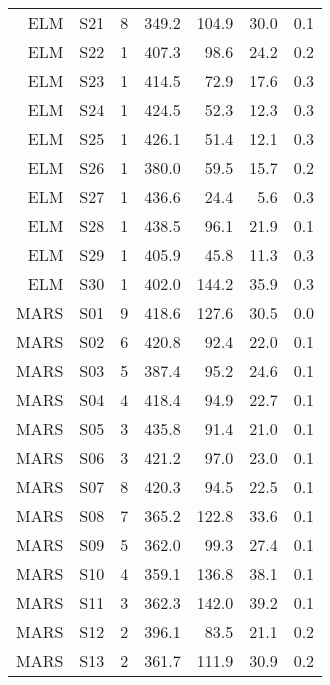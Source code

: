 \begin{table}
\begin{tabular}{rrrrrrr}
  ELM &  S21 &             8 &   349.2 & 104.9 &         30.0 &    0.1 \\
  ELM &  S22 &             1 &   407.3 &  98.6 &         24.2 &    0.2 \\
  ELM &  S23 &             1 &   414.5 &  72.9 &         17.6 &    0.3 \\
  ELM &  S24 &             1 &   424.5 &  52.3 &         12.3 &    0.3 \\
  ELM &  S25 &             1 &   426.1 &  51.4 &         12.1 &    0.3 \\
  ELM &  S26 &             1 &   380.0 &  59.5 &         15.7 &    0.2 \\
  ELM &  S27 &             1 &   436.6 &  24.4 &          5.6 &    0.3 \\
  ELM &  S28 &             1 &   438.5 &  96.1 &         21.9 &    0.1 \\
  ELM &  S29 &             1 &   405.9 &  45.8 &         11.3 &    0.3 \\
  ELM &  S30 &             1 &   402.0 & 144.2 &         35.9 &    0.3 \\
 MARS &  S01 &             9 &   418.6 & 127.6 &         30.5 &    0.0 \\
 MARS &  S02 &             6 &   420.8 &  92.4 &         22.0 &    0.1 \\
 MARS &  S03 &             5 &   387.4 &  95.2 &         24.6 &    0.1 \\
 MARS &  S04 &             4 &   418.4 &  94.9 &         22.7 &    0.1 \\
 MARS &  S05 &             3 &   435.8 &  91.4 &         21.0 &    0.1 \\
 MARS &  S06 &             3 &   421.2 &  97.0 &         23.0 &    0.1 \\
 MARS &  S07 &             8 &   420.3 &  94.5 &         22.5 &    0.1 \\
 MARS &  S08 &             7 &   365.2 & 122.8 &         33.6 &    0.1 \\
 MARS &  S09 &             5 &   362.0 &  99.3 &         27.4 &    0.1 \\
 MARS &  S10 &             4 &   359.1 & 136.8 &         38.1 &    0.1 \\
 MARS &  S11 &             3 &   362.3 & 142.0 &         39.2 &    0.1 \\
 MARS &  S12 &             2 &   396.1 &  83.5 &         21.1 &    0.2 \\
 MARS &  S13 &             2 &   361.7 & 111.9 &         30.9 &    0.2 \\

\end{tabular}
\end{table}
